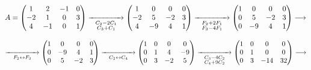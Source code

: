 \documentclass[twoside]{report}
\theoremstyle{mystyle}
\begin{document}
$$
A = 
\begin{pmatrix}
1 & 2 & -1 & 0\\
-2 & 1 & 0 & 3\\
4 & -1 & 0 & 1 
\end{pmatrix}
\underset{\substack{C_{2} - 2C_{1} \\ C_{3} + C_{1}}}{\xrightarrow{\hspace{15mm}}}
\begin{pmatrix}
1 & 0 & 0 & 0\\
-2 & 5 & -2 & 3\\
4 & -9 & 4 & 1 
\end{pmatrix}
\underset{\substack{F_{2} + 2F_{1} \\ F_{3} -4 F_{1}}}{\xrightarrow{\hspace{15mm}}}
\begin{pmatrix}
1 & 0 & 0 & 0\\
0 & 5 & -2 & 3\\
0 & -9 & 4 & 1 
\end{pmatrix}
\longrightarrow
$$

\vspace{3mm}

$$
\underset{F_{2} \leftrightarrow F_{3}}{\xrightarrow{\hspace{15mm}}}
\begin{pmatrix}
1 & 0 & 0 & 0\\
0 & -9 & 4 & 1\\
0 & 5 & -2 & 3 
\end{pmatrix}
\underset{C_{2} \leftrightarrow C_{4}}{\xrightarrow{\hspace{15mm}}}
\begin{pmatrix}
1 & 0 & 0 & 0\\
0 & 1 & 4 & -9\\
0 & 3 & -2 & 5 
\end{pmatrix}
\underset{\substack{C_{3} - 4C_{2} \\ C_{4} + 9C_{2}}}{\xrightarrow{\hspace{15mm}}}
\begin{pmatrix}
1 & 0 & 0 & 0\\
0 & 1 & 0 & 0\\
0 & 3 & -14 & 32 
\end{pmatrix}
\longrightarrow
$$

\vspace{3mm}
\end{document}
